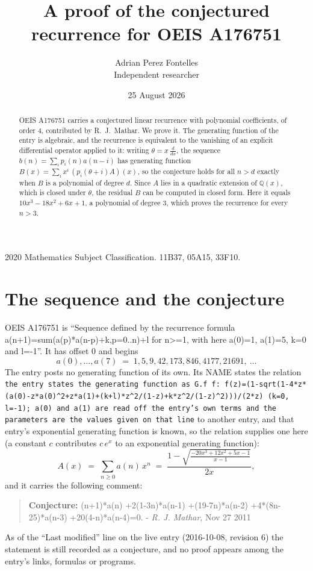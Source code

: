 \documentclass[11pt,a4paper]{article}
\title{A proof of the conjectured recurrence for OEIS A176751}
\author{Adrian Perez Fontelles\\ \small Independent researcher}
\date{25 August 2026}
\theoremstyle{plain}
\theoremstyle{definition}
\begin{document}
\maketitle

\begin{abstract}
OEIS A176751 carries a conjectured linear recurrence with polynomial coefficients, of
order 4, contributed by R.~J.~Mathar. We prove it. The generating function of the
entry is algebraic, and the recurrence is equivalent to the vanishing of an explicit
differential operator applied to it: writing $\theta=x\,\frac{d}{dx}$, the sequence
$b(n)=\sum_{i}p_{i}(n)a(n-i)$ has generating function
$B(x)=\sum_{i}x^{i}\,(p_{i}(\theta+i)A)(x)$, so the conjecture holds for all $n>d$ exactly
when $B$ is a polynomial of degree $d$. Since $A$ lies in a quadratic extension of
$\mathbb{Q}(x)$, which is closed under $\theta$, the residual $B$ can be computed in
closed form. Here it equals $10 x^{3} - 18 x^{2} + 6 x + 1$, a polynomial of degree $3$, which proves
the recurrence for every $n>3$.
\end{abstract}

\noindent\small 2020 Mathematics Subject Classification. 11B37, 05A15, 33F10.\normalsize

\section{The sequence and the conjecture}

OEIS A176751 is ``Sequence defined by the recurrence formula a(n+1)=sum(a(p)*a(n-p)+k,p=0..n)+l for n>=1, with here a(0)=1, a(1)=5, k=0 and l=-1''. It has offset $0$ and begins
\[
a(0),\dots,a(7)\;=\;1, 5, 9, 42, 173, 846, 4177, 21691,\ \dots
\]
The entry posts no generating function of its own. Its NAME states the
relation \texttt{the entry states the generating function as G.f f: f(z)=(1-sqrt(1-4*z*(a(0)-z*a(0)\textasciicircum{}2+z*a(1)+(k+l)*z\textasciicircum{}2/(1-z)+k*z\textasciicircum{}2/(1-z)\textasciicircum{}2)))/(2*z) (k=0, l=-1); a(0) and a(1) are read off the entry's own terms and the parameters are the values given on that line} to another entry, and that entry's exponential generating
function is known, so the relation supplies one here (a constant $c$ contributes
$c\,e^{x}$ to an exponential generating function):
\begin{equation}\label{eq:gf}
A(x)\;=\;\sum_{n\ge 0} a(n)\,x^{n}\;=\;\frac{1 - \sqrt{\frac{- 20 x^{3} + 12 x^{2} + 5 x - 1}{x - 1}}}{2 x} ,
\end{equation}
and it carries the following comment:
\begin{quote}\small
\textbf{Conjecture:} (n+1)*a(n) +2(1-3n)*a(n-1) +(19-7n)*a(n-2) +4*(8n-25)*a(n-3) +20(4-n)*a(n-4)=0. - \emph{R. J. Mathar}, Nov 27 2011
\end{quote}
As of the ``Last modified'' line on the live entry (2016-10-08, revision 6) the
statement is still recorded as a conjecture, and no proof appears among the entry's links,
formulas or programs.
\end{document}

